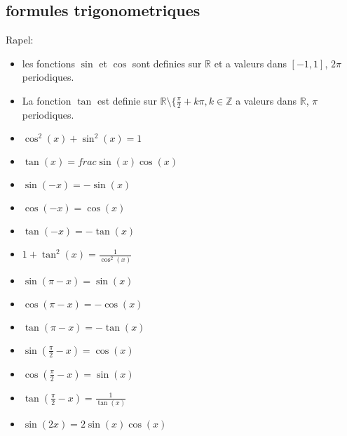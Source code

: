 \documentclass[letterpaper,10pt,french]{jupyterBook}
\begin{document}
\subsection{formules trigonometriques}
\label{\detokenize{fcthycerinvs:formules-trigonometriques}}
\sphinxAtStartPar
Rapel:
\begin{itemize}
\item {} 
\sphinxAtStartPar
les fonctions \(\sin\) et \(\cos\) sont definies sur \(\mathbb{R}\) et a valeurs dans \([-1, 1]\), \(2\pi\)\sphinxhyphen{}periodiques.

\item {} 
\sphinxAtStartPar
La fonction \(\tan\) est definie sur \(\mathbb{R}\setminus \{\frac{\pi}{2} +k\pi, k\in \mathbb{Z}\) a valeurs dans \(\mathbb{R}\), \(\pi\)\sphinxhyphen{}periodiques.

\item {} 
\sphinxAtStartPar
\(\cos^2(x) + \sin^2(x) = 1\)

\item {} 
\sphinxAtStartPar
\(\tan(x) = frac{\sin(x)}{\cos(x)}\)

\item {} 
\sphinxAtStartPar
\(\sin(-x) = -\sin(x)\)

\item {} 
\sphinxAtStartPar
\(\cos(-x) =\cos(x)\)

\item {} 
\sphinxAtStartPar
\(\tan(-x) = - \tan(x)\)

\item {} 
\sphinxAtStartPar
\( 1 + \tan^2(x) = \frac{1}{\cos^2(x)}\)

\item {} 
\sphinxAtStartPar
\(\sin(\pi - x) = \sin(x)\)

\item {} 
\sphinxAtStartPar
\(\cos(\pi - x) = - \cos(x)\)

\item {} 
\sphinxAtStartPar
\(\tan(\pi - x) = - \tan(x)\)

\item {} 
\sphinxAtStartPar
\(\sin(\frac{\pi}{2} - x)  = \cos(x)\)

\item {} 
\sphinxAtStartPar
\(\cos(\frac{\pi}{2} - x)  = \sin(x)\)

\item {} 
\sphinxAtStartPar
\(\tan(\frac{\pi}{2} - x)  = \frac{1}{\tan(x)}\)

\item {} 
\sphinxAtStartPar
\(\sin(2x) = 2\sin(x)\cos(x)\)


\end{itemize}
\end{document}
